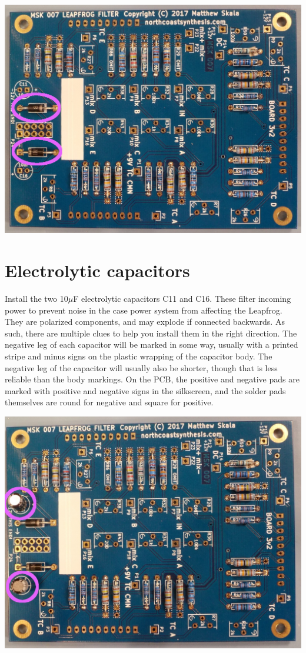 \noindent\includegraphics[width=\linewidth]{schottky.jpg}

\section{Electrolytic capacitors}

Install the two 10$\mu$F electrolytic capacitors C11 and C16.  These filter
incoming power to prevent noise in the case power system from affecting the
Leapfrog.  They are polarized components, and may explode if connected
backwards.  As such, there are multiple clues to help you install them in
the right direction.  The negative leg of each capacitor will be marked in
some way, usually with a printed stripe and minus signs on the plastic
wrapping of the capacitor body.  The negative leg of the capacitor will
usually also be shorter, though that is less reliable than the body
markings.  On the PCB, the positive and negative pads are marked with
positive and negative signs in the silkscreen, and the solder pads
themselves are round for negative and square for positive.

\noindent\includegraphics[width=\linewidth]{cap-10u3.jpg}

